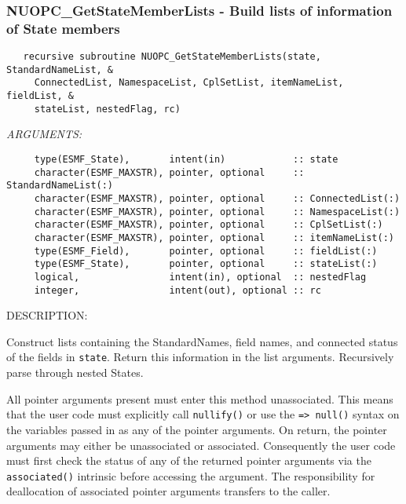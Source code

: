 \subsubsection [NUOPC\_GetStateMemberLists] {NUOPC\_GetStateMemberLists - Build lists of information of State members}


\begin{verbatim}   recursive subroutine NUOPC_GetStateMemberLists(state, StandardNameList, &
     ConnectedList, NamespaceList, CplSetList, itemNameList, fieldList, &
     stateList, nestedFlag, rc)\end{verbatim}{\em ARGUMENTS:}
\begin{verbatim}     type(ESMF_State),       intent(in)            :: state
     character(ESMF_MAXSTR), pointer, optional     :: StandardNameList(:)
     character(ESMF_MAXSTR), pointer, optional     :: ConnectedList(:)
     character(ESMF_MAXSTR), pointer, optional     :: NamespaceList(:)
     character(ESMF_MAXSTR), pointer, optional     :: CplSetList(:)
     character(ESMF_MAXSTR), pointer, optional     :: itemNameList(:)
     type(ESMF_Field),       pointer, optional     :: fieldList(:)
     type(ESMF_State),       pointer, optional     :: stateList(:)
     logical,                intent(in), optional  :: nestedFlag
     integer,                intent(out), optional :: rc\end{verbatim}
{\sf DESCRIPTION:\\ }


     Construct lists containing the StandardNames, field names, and connected 
     status of the fields in {\tt state}. Return this information in the
     list arguments. Recursively parse through nested States.
  
     All pointer arguments present must enter this method unassociated. This
     means that the user code must explicitly call {\tt nullify()} or use the
     {\tt => null()} syntax on the variables passed in as any of the pointer
     arguments. On return, the pointer arguments may either be unassociated or
     associated. Consequently the user code must first check the status of any
     of the returned pointer arguments via the {\tt associated()} intrinsic
     before accessing the argument. The responsibility for deallocation of
     associated pointer arguments transfers to the caller.
  
